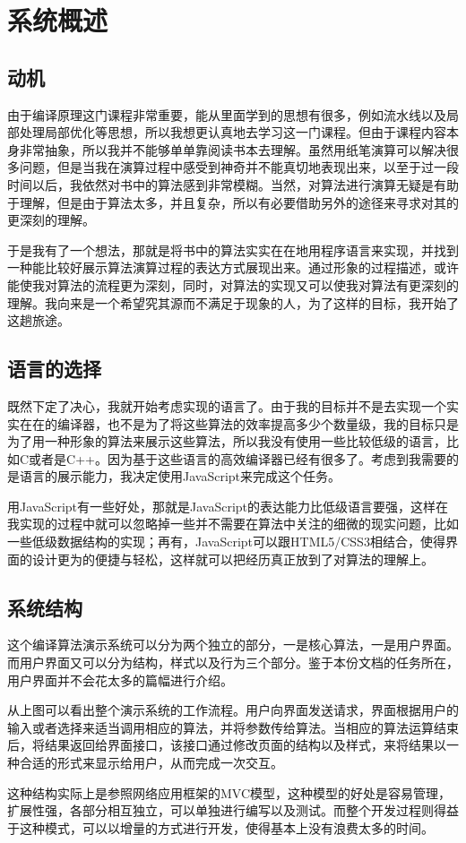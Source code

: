 \chapter{系统概述}

\section{动机}

由于编译原理这门课程非常重要，能从里面学到的思想有很多，例如流水线以及局部处理局部优化等思想，所以我想更认真地去学习这一门课程。但由于课程内容本身非常抽象，所以我并不能够单单靠阅读书本去理解。虽然用纸笔演算可以解决很多问题，但是当我在演算过程中感受到神奇并不能真切地表现出来，以至于过一段时间以后，我依然对书中的算法感到非常模糊。当然，对算法进行演算无疑是有助于理解，但是由于算法太多，并且复杂，所以有必要借助另外的途径来寻求对其的更深刻的理解。

于是我有了一个想法，那就是将书中的算法实实在在地用程序语言来实现，并找到一种能比较好展示算法演算过程的表达方式展现出来。通过形象的过程描述，或许能使我对算法的流程更为深刻，同时，对算法的实现又可以使我对算法有更深刻的理解。我向来是一个希望究其源而不满足于现象的人，为了这样的目标，我开始了这趟旅途。

\section{语言的选择}

既然下定了决心，我就开始考虑实现的语言了。由于我的目标并不是去实现一个实实在在的编译器，也不是为了将这些算法的效率提高多少个数量级，我的目标只是为了用一种形象的算法来展示这些算法，所以我没有使用一些比较低级的语言，比如C或者是C++。因为基于这些语言的高效编译器已经有很多了。考虑到我需要的是语言的展示能力，我决定使用JavaScript来完成这个任务。

用JavaScript有一些好处，那就是JavaScript的表达能力比低级语言要强，这样在我实现的过程中就可以忽略掉一些并不需要在算法中关注的细微的现实问题，比如一些低级数据结构的实现；再有，JavaScript可以跟HTML5/CSS3相结合，使得界面的设计更为的便捷与轻松，这样就可以把经历真正放到了对算法的理解上。

\section{系统结构}

这个编译算法演示系统可以分为两个独立的部分，一是核心算法，一是用户界面。而用户界面又可以分为结构，样式以及行为三个部分。鉴于本份文档的任务所在，用户界面并不会花太多的篇幅进行介绍。



从上图可以看出整个演示系统的工作流程。用户向界面发送请求，界面根据用户的输入或者选择来适当调用相应的算法，并将参数传给算法。当相应的算法运算结束后，将结果返回给界面接口，该接口通过修改页面的结构以及样式，来将结果以一种合适的形式来显示给用户，从而完成一次交互。

这种结构实际上是参照网络应用框架的MVC模型，这种模型的好处是容易管理，扩展性强，各部分相互独立，可以单独进行编写以及测试。而整个开发过程则得益于这种模式，可以以增量的方式进行开发，使得基本上没有浪费太多的时间。
